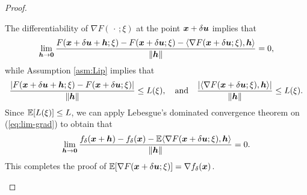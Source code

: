 \begin{proof}
\begin{enumerate}
		The differentiability of $\nabla F(\,\cdot\,;\xi)$ at the point ${\bm{x}}+ \delta {\bm{u}} $ implies that 
		\begin{align*}
			\lim_{{\bm{h}} \rightarrow {\bm{0}}} \frac{F({\bm{x}}+\delta {\bm{u}} + {\bm{h}}; \xi) - F({\bm{x}}+\delta {\bm{u}}; \xi) - \langle \nabla F({\bm{x}}+\delta {\bm{u}};\xi), {\bm{h}} \rangle  }{\Vert {\bm{h}} \Vert}  = 0,
		\end{align*}
		while Assumption \ref{asm:Lip} implies that 
		\begin{align*}
			\frac{\vert F({\bm{x}}+\delta {\bm{u}}+{\bm{h}}; \xi) - F({\bm{x}}+\delta {\bm{u}}; \xi)\vert }{\Vert {\bm{h}} \Vert} \le L(\xi), \quad {\rm and} \quad \frac{\vert \langle \nabla F({\bm{x}}+\delta {\bm{u}};\xi), {\bm{h}} \rangle \vert }{\Vert {\bm{h}} \Vert}  \le L(\xi). 
		\end{align*}
		Since $\mathbb{E}[L(\xi)] \le L $, we can apply Lebesgue's dominated convergence theorem on (\ref{eq:lim-grad}) to obtain that 
		\begin{align*}
			\lim_{{\bm{h}} \rightarrow {\bm{0}}} \frac{f_\delta({\bm{x}}+{\bm{h}}) - f_\delta({\bm{x}}) - \mathbb{E}\langle \nabla F({\bm{x}}+\delta {\bm{u}};\xi), {\bm{h}} \rangle  }{\Vert {\bm{h}} \Vert} =0.
		\end{align*}
		This completes the proof of $ \mathbb{E} [\nabla F({\bm{x}}+ \delta {\bm{u}};\xi)] = \nabla f_\delta({\bm{x}})$.    

\end{enumerate}
\end{proof}
